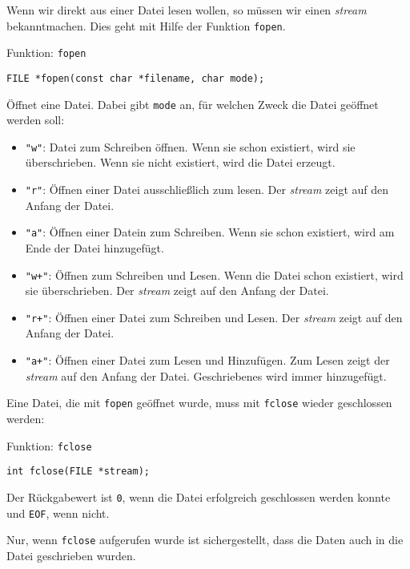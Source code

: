 Wenn wir direkt aus einer Datei lesen wollen, so müssen wir einen \emph{stream} bekanntmachen.
Dies geht mit Hilfe der Funktion \verb|fopen|.
\begin{myexampleblock}{Funktion: \texttt{fopen}}
\begin{lstlisting}
FILE *fopen(const char *filename, char mode);
\end{lstlisting}
  \vspace{-0.4cm}
  Öffnet eine Datei. Dabei gibt \texttt{mode} an, für welchen Zweck die Datei geöffnet werden soll:
  \begin{itemize} 
    \itemsep0.5ex
  \item \texttt{"w"}: Datei zum Schreiben öffnen. Wenn sie schon existiert, wird sie überschrieben. Wenn sie nicht existiert, wird die Datei erzeugt.
  \item \texttt{"r"}: Öffnen einer Datei ausschließlich zum lesen. Der \emph{stream} zeigt auf den Anfang der Datei.
  \item \texttt{"{}a"}: Öffnen einer Datein zum Schreiben. Wenn sie schon existiert, wird am Ende der Datei hinzugefügt.
  \item \texttt{"w+"}: Öffnen zum Schreiben und Lesen. Wenn die Datei schon existiert, wird sie überschrieben. Der \emph{stream} zeigt auf den Anfang der Datei.
  \item \texttt{"r+"}: Öffnen einer Datei zum Schreiben und Lesen. Der \emph{stream} zeigt auf den Anfang der Datei.
  \item \texttt{"{}a+"}: Öffnen einer Datei zum Lesen und Hinzufügen. Zum Lesen zeigt der \emph{stream} auf den Anfang der Datei. Geschriebenes wird immer hinzugefügt.
  \end{itemize}
\end{myexampleblock}  
Eine Datei, die mit \texttt{fopen} geöffnet wurde, muss mit \texttt{fclose} wieder geschlossen werden:
\begin{myexampleblock}{Funktion: \texttt{fclose}}
\begin{lstlisting}
int fclose(FILE *stream);
\end{lstlisting}
  \vspace{-0.4cm}
  Der Rückgabewert ist \texttt{0}, wenn die Datei erfolgreich geschlossen werden konnte und \texttt{EOF}, wenn nicht.
\end{myexampleblock}
Nur, wenn \texttt{fclose} aufgerufen wurde ist sichergestellt, dass die Daten auch in die Datei geschrieben wurden.

